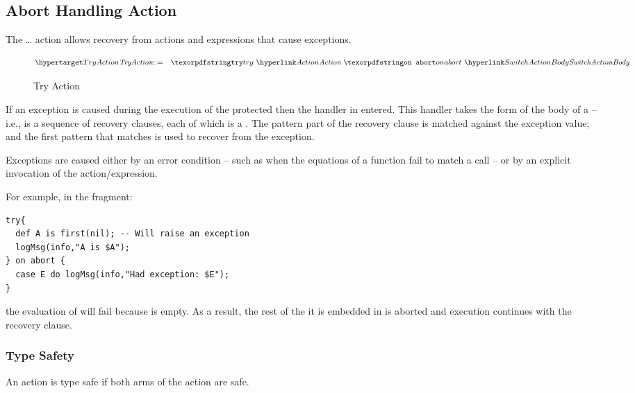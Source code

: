 \subsection{Abort Handling Action}
\label{except}
The  \ldots{}  action allows recovery from actions and expressions that cause exceptions.
\begin{figure}[htbp]
\begin{eqnarray*}
\ntDef{TryAction}&\arrow&\q{try}\ \ntRef{Action}\ \q{on abort}\ \ntRef{SwitchActionBody}
\end{eqnarray*}
\caption{Try Action}
\label{tryActionFig}
\end{figure}

If an exception is caused during the execution of the protected  then the handler in entered. This handler takes the form of the body of a  -- i.e., is a sequence of recovery clauses, each of which is a . The pattern part of the recovery clause is matched against the exception value; and the first pattern that matches is used to recover from the exception.

Exceptions are caused either by an error condition -- such as when the equations of a function fail to match a call -- or by an explicit invocation of the  action/expression.

For example, in the fragment:
\begin{lstlisting}
try{
  def A is first(nil); -- Will raise an exception
  logMsg(info,"A is $A");
} on abort {
  case E do logMsg(info,"Had exception: $E");
}
\end{lstlisting}
the evaluation of  will fail because  is empty. As a result, the rest of the  it is embedded in is aborted and execution continues with the recovery clause.

\subsubsection{Type Safety}
An  action is type safe if both arms of the action are safe.

\begin{prooftree}
\end{prooftree}
